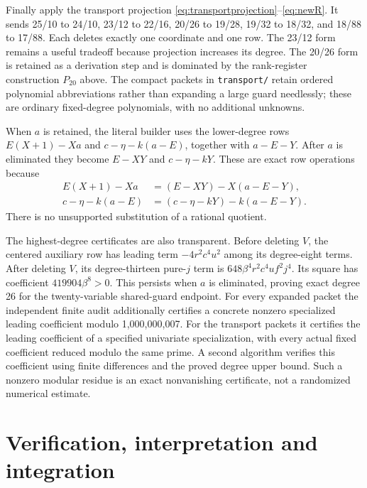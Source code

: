 \documentclass[11pt]{article}
\theoremstyle{remark}\newtheorem{remark}[theorem]{Remark}
\begin{document}
Finally apply the transport projection
\eqref{eq:transportprojection}--\eqref{eq:newR}. It sends 25/10 to
24/10, 23/12 to 22/16, 20/26 to 19/28, 19/32 to 18/32, and 18/88 to
17/88. Each deletes exactly one coordinate and one row. The 23/12 form
remains a useful tradeoff because projection increases its degree.
The 20/26 form is retained as a derivation step and is dominated by the
rank-register construction $P_{20}$ above. The compact packets in
\texttt{transport/} retain ordered
polynomial abbreviations rather than expanding a large guard needlessly;
these are ordinary fixed-degree polynomials, with no additional unknowns.

When $a$ is retained, the literal builder uses the lower-degree rows
$E(X+1)-Xa$ and $c-\eta-k(a-E)$, together with $a-E-Y$.
After $a$ is eliminated they become $E-XY$ and $c-\eta-kY$.
These are exact row operations because
\begin{align*}
 E(X+1)-Xa&=(E-XY)-X(a-E-Y),\\
 c-\eta-k(a-E)&=(c-\eta-kY)-k(a-E-Y).
\end{align*}
There is no unsupported substitution of a rational quotient.

The highest-degree certificates are also transparent. Before deleting
$V$, the centered auxiliary row has leading term
$-4r^2c^4u^2$ among its degree-eight terms. After deleting $V$, its
degree-thirteen pure-$j$ term is
$648\beta^4r^2c^4uf^2j^4$. Its square has coefficient
$419904\beta^8>0$. This persists when $a$ is eliminated, proving exact
degree 26 for the twenty-variable shared-guard endpoint. For every
expanded packet the independent finite audit additionally certifies a concrete
nonzero specialized leading coefficient modulo 1,000,000,007. For the
transport packets it certifies the leading coefficient of a specified
univariate specialization, with every actual fixed coefficient reduced
modulo the same prime. A second algorithm verifies this coefficient
using finite differences and the proved degree upper bound.
Such a nonzero modular residue is an exact nonvanishing certificate,
not a randomized numerical estimate.





\section{Verification, interpretation and integration}
\label{sec:verification}
\end{document}
